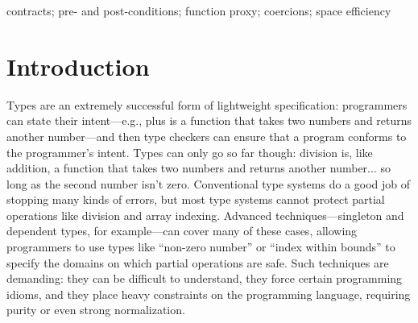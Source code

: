 \documentclass[9pt]{extarticle}
\begin{document}
\iffull\else
{}



\keywords
contracts; pre- and post-conditions; function proxy; coercions; space efficiency
\fi

\section{Introduction}
\label{sec:intro}

Types are an extremely successful form of lightweight specification:
programmers can state their intent---e.g., plus is a function that
takes two numbers and returns another number---and then type checkers
can ensure that a program conforms to the programmer's intent.
Types can only go so far though: division is, like addition, a
function that takes two numbers and returns another number... so long
as the second number isn't zero. Conventional type systems do a good
job of stopping many kinds of errors, but most type systems cannot
protect partial operations like division and array indexing.
Advanced techniques---singleton and dependent types, for example---can
cover many of these cases, allowing programmers to use types like
``non-zero number'' or ``index within bounds'' to specify the domains
on which partial operations are safe. Such techniques are demanding:
they can be difficult to understand, they force certain programming
idioms, and they place heavy constraints on the programming language,
requiring purity or even strong normalization.
\end{document}
